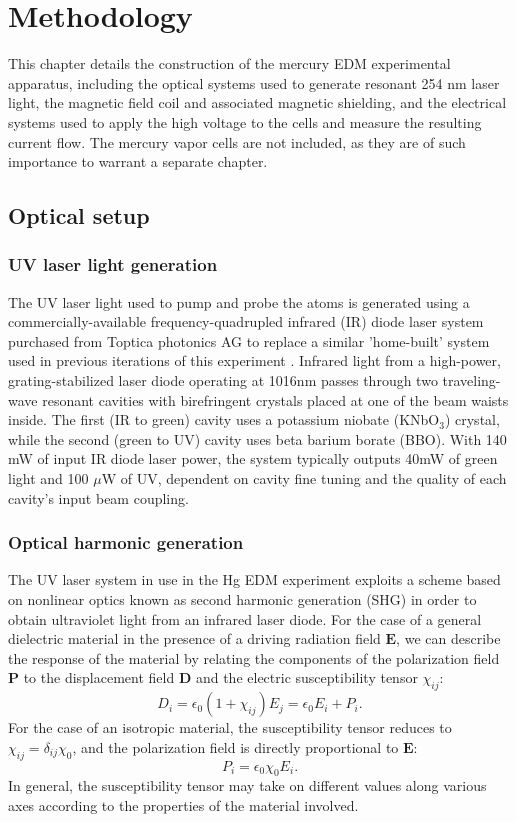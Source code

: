 \documentclass [10pt, twoside] {uwthesis}[2012/04/02]
\begin{document}
\cleardoublepage

\chapter{Methodology}
This chapter details the construction of the mercury EDM experimental apparatus, including the optical systems used to generate resonant 254 nm laser light, the magnetic field coil and associated magnetic shielding, and the electrical systems used to apply the high voltage to the cells and measure the resulting current flow.
The mercury vapor cells are not included, as they are of such importance to warrant a separate chapter.
\section{Optical setup}
\subsection{UV laser light generation}
The UV laser light used to pump and probe the atoms is generated using a commercially-available frequency-quadrupled infrared (IR) diode laser system purchased from Toptica photonics AG to replace a similar 'home-built' system used in previous iterations of this experiment \cite{2001_Hg_EDM, 2009_Hg_EDM}. Infrared light from a high-power, grating-stabilized laser diode operating at 1016nm passes through two traveling-wave resonant cavities with birefringent crystals placed at one of the beam waists inside. The first (IR to green) cavity uses a potassium niobate (KNbO$_3$) crystal, while the second (green to UV) cavity uses beta barium borate (BBO). With 140 mW of input IR diode laser power, the system typically outputs 40mW of green light and 100 $\mu$W of UV, dependent on cavity fine tuning and the quality of each cavity's input beam coupling. 

\subsection{Optical harmonic generation}
The UV laser system in use in the Hg EDM experiment exploits a scheme based on nonlinear optics known as second harmonic generation (SHG) in order to obtain ultraviolet light from an infrared laser diode. For the case of a general dielectric material in the presence of a driving radiation field $\mathbf{E}$, we can describe the response of the material by relating the components of the polarization field $\mathbf{P}$ to the displacement field $\mathbf{D}$ and the electric susceptibility tensor $\chi_{ij}$: 
\begin{equation} D_i = \epsilon_0 (1+\chi_{ij})E_j = \epsilon_0E_i + P_i.\end{equation} For the case of an isotropic material, the susceptibility tensor reduces to $\chi_{ij} = \delta_{ij} \chi_0$, and the polarization field is directly proportional to $\mathbf{E}$: 
\begin{equation} P_i = \epsilon_0\chi_0E_i. \end{equation} 
In general, the susceptibility tensor may take on different values along various axes according to the properties of the material involved.
	
\end{document}
